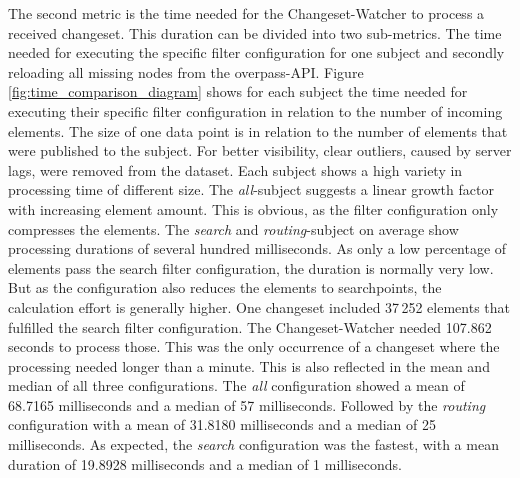 \documentclass[conference]{IEEEtran}
\begin{document}
The second metric is the time needed for the Changeset-Watcher to process a received changeset. This duration can be divided into two sub-metrics. The time needed for executing the specific filter configuration for one subject and secondly reloading all missing nodes from the overpass-API. Figure \ref{fig:time_comparison_diagram} shows for each subject the time needed for executing their specific filter configuration in relation to the number of incoming elements.
The size of one data point is in relation to the number of elements that were published to the subject. For better visibility, clear outliers, caused by server lags, were removed from the dataset. Each subject shows a high variety in processing time of different size. The \textit{all}-subject suggests a linear growth factor with increasing element amount. This is obvious, as the filter configuration only compresses the elements. The \textit{search} and \textit{routing}-subject on average show processing durations of several hundred milliseconds. As only a low percentage of elements pass the search filter configuration, the duration is normally very low. But as the configuration also reduces the elements to searchpoints, the calculation effort is generally higher. One changeset included 37\,252 elements that fulfilled the search filter configuration. The Changeset-Watcher needed 107.862 seconds to process those. This was the only occurrence of a changeset where the processing needed longer than a minute. This is also reflected in the mean and median of all three configurations. The \textit{all} configuration showed a mean of 68.7165 milliseconds and a median of 57 milliseconds. Followed by the \textit{routing} configuration with a mean of 31.8180 milliseconds and a median of 25 milliseconds. As expected, the \textit{search} configuration was the fastest, with a mean duration of 19.8928 milliseconds and a median of 1 milliseconds.
\end{document}
